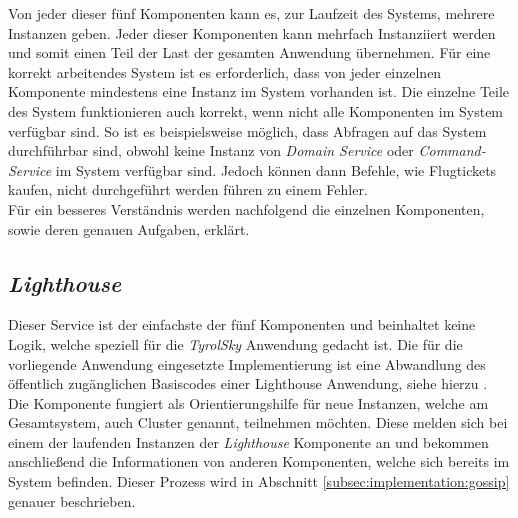 Von jeder dieser fünf Komponenten kann es, zur Laufzeit des Systems, mehrere Instanzen  geben. 
Jeder dieser Komponenten kann mehrfach Instanziiert werden und somit einen Teil der Last der gesamten Anwendung übernehmen. Für eine korrekt arbeitendes System ist es erforderlich, dass von jeder einzelnen Komponente mindestens eine Instanz im System vorhanden ist. Die einzelne Teile des System funktionieren auch korrekt, wenn nicht alle Komponenten im System verfügbar sind. So ist es beispielsweise möglich, dass Abfragen auf das System durchführbar sind, obwohl keine Instanz von \textit{Domain Service} oder \textit{Command-Service} im System verfügbar sind. Jedoch können dann Befehle, wie Flugtickets kaufen, nicht durchgeführt werden führen zu einem Fehler.\\
% 
% 


Für ein besseres Verständnis werden nachfolgend die einzelnen Komponenten, sowie deren genauen Aufgaben, erklärt.

\subsection{\textit{Lighthouse}}
\label{subsec:implementation:lighthouse}
Dieser Service ist der einfachste der fünf Komponenten und beinhaltet keine Logik, welche speziell für die \textit{TyrolSky} Anwendung gedacht ist. Die für die vorliegende Anwendung eingesetzte Implementierung ist eine Abwandlung des öffentlich zugänglichen Basiscodes einer Lighthouse Anwendung, siehe hierzu \cite{lighthouse}. \\
Die Komponente fungiert als Orientierungshilfe für neue Instanzen, welche am Gesamtsystem, auch Cluster genannt, teilnehmen möchten. Diese melden sich bei einem der laufenden Instanzen der \textit{Lighthouse} Komponente an und bekommen anschließend die Informationen von anderen Komponenten, welche sich bereits im System befinden. Dieser Prozess wird in Abschnitt \ref{subsec:implementation:gossip} genauer beschrieben.

